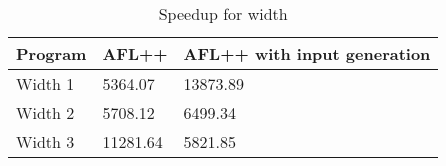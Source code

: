 \begin{table}
\caption{Speedup for width}
\label{tab:width_speedup}
\begin{tabular}{lll}
\toprule
Program & AFL++ & AFL++ with input generation \\
\midrule
Width 1 & 5364.07 & 13873.89 \\
Width 2 & 5708.12 & 6499.34 \\
Width 3 & 11281.64 & 5821.85 \\
\bottomrule
\end{tabular}
\end{table}

